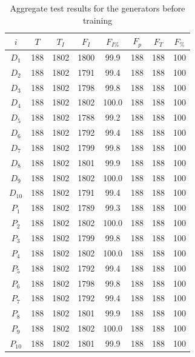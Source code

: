 \documentclass[12pt, titlepage]{report}
\theoremstyle{definition}
\begin{document}
\begin{table}
\begin{tabular}{cSSSSSSS} \toprule
    {$i$}     & {$T$} 	& {$T_I$}	& {$F_I$} 	& {$F_{I\%}$}		& {$F_p$} 	& {$F_T$} 	& {$F_{\%}$} \\ \midrule
    $D_1$  & 188   	& 1802		& 1800	 	& 99.9				& 188	 		& 188	 		& 100 \\
    $D_2$  & 188   	& 1802 		& 1791  		& 	99.4				& 188	 		& 188	 		& 100 \\
    $D_3$  & 188  	& 1802 		& 1798  		& 99.8				& 188	 		& 188	 		& 100 \\
    $D_4$  & 188   	& 1802 		& 1802  		& 100.0			& 188  		& 188  		& 100 \\
    $D_5$  & 188   	& 1802 		& 1788   		& 99.2				& 188  		& 188  		& 100 \\
    $D_6$  & 188  	& 1802 		& 1792  		& 99.4				& 188  		& 188 			& 100 \\
    $D_7$  & 188   	& 1802 		& 1799  		& 99.8				& 188  		& 188  		& 100 \\
    $D_8$  & 188   	& 1802 		& 1801  		& 99.9				& 188  		& 188  		& 100 \\
    $D_9$  & 188   	& 1802 		& 1802  		& 100.0			& 188  		& 188  		& 100 \\
    $D_{10}$ & 188  	& 1802 		& 1791  		& 99.4				& 188  		& 188  		& 100 \\ \midrule
    $P_1$  & 188   	& 1802 		& 1789    	& 99.3				& 188  		& 188  		& 100 \\
    $P_2$  & 188   	& 1802 		& 1802  		& 100.0			& 188  		& 188  		& 100 \\
    $P_3$  & 188   	& 1802 		& 1799  		& 99.8				& 188  		& 188  		& 100 \\
    $P_4$  & 188   	& 1802 		& 1802  		& 100.0			& 188  		& 188  		& 100 \\
    $P_5$  & 188   	& 1802 		& 1792   		& 99.4				& 188  		& 188  		& 100 \\
    $P_6$  & 188   	& 1802 		& 1798  		& 99.8				& 188  		& 188  		& 100 \\
    $P_7$  & 188   	& 1802 		& 1792  		& 99.4				& 188  		& 188  		& 100 \\
    $P_8$  & 188   	& 1802 		& 1801  		& 99.9				& 188  		& 188  		& 100 \\
    $P_9$  & 188   	& 1802 		& 1802  		& 100.0			& 188  		& 188  		& 100 \\
    $P_{10}$ & 188  	& 1802 		& 1801  		& 99.9				& 188  		& 188  		& 100 \\ \bottomrule
\end{tabular}

\caption{Aggregate test results for the generators before training}
\end{table}
\end{document}

